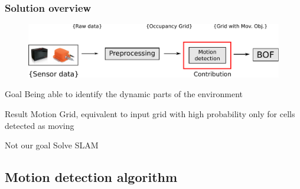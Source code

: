 \documentclass{beamer}
\begin{document}
	\begin{frame}
		\frametitle{Solution overview}
		\begin{figure}[h]
			\center
			\includegraphics[scale=0.6]{img/fig:motion:overview:01}
		 \end{figure}
		\begin{block}{Goal}
			 Being able to identify the dynamic parts of the environment
		\end{block}
		 
		\begin{block}{Result}
			Motion Grid, equivalent to input grid with high probability only for cells detected as moving
		\end{block}				 

		\begin{alertblock}{Not our goal}
			Solve SLAM
		\end{alertblock}
	\end{frame}

\subsection{Motion detection algorithm}
\end{document}

